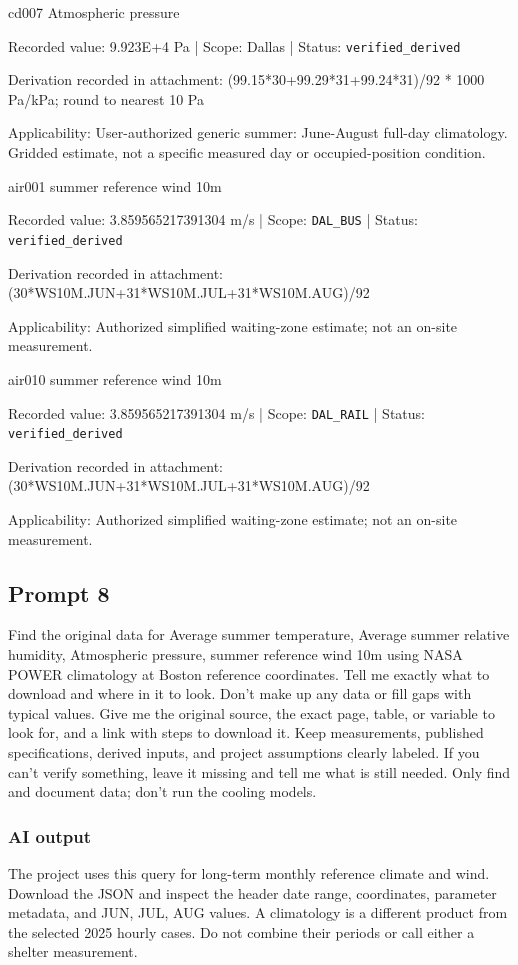 cd007  Atmospheric pressure

Recorded value: 9.923E+4 Pa | Scope: Dallas | Status: \nolinkurl{verified_derived}

Derivation recorded in attachment: (99.15*30+99.29*31+99.24*31)/92 * 1000 Pa/kPa; round to nearest 10 Pa

Applicability: User-authorized generic summer: June-August full-day climatology. Gridded estimate, not a specific measured day or occupied-position condition.

air001  summer reference wind 10m

Recorded value: 3.859565217391304 m/s | Scope: \nolinkurl{DAL_BUS} | Status: \nolinkurl{verified_derived}

Derivation recorded in attachment: (30*WS10M.JUN+31*WS10M.JUL+31*WS10M.AUG)/92

Applicability: Authorized simplified waiting-zone estimate; not an on-site measurement.

air010  summer reference wind 10m

Recorded value: 3.859565217391304 m/s | Scope: \nolinkurl{DAL_RAIL} | Status: \nolinkurl{verified_derived}

Derivation recorded in attachment: (30*WS10M.JUN+31*WS10M.JUL+31*WS10M.AUG)/92

Applicability: Authorized simplified waiting-zone estimate; not an on-site measurement.

\subsection*{Prompt 8}
Find the original data for Average summer temperature, Average summer relative humidity, Atmospheric pressure, summer reference wind 10m using NASA POWER climatology at Boston reference coordinates. Tell me exactly what to download and where in it to look. Don’t make up any data or fill gaps with typical values. Give me the original source, the exact page, table, or variable to look for, and a link with steps to download it. Keep measurements, published specifications, derived inputs, and project assumptions clearly labeled. If you can’t verify something, leave it missing and tell me what is still needed. Only find and document data; don’t run the cooling models.

\subsubsection*{AI output}
The project uses this query for long-term monthly reference climate and wind. Download the JSON and inspect the header date range, coordinates, parameter metadata, and JUN, JUL, AUG values. A climatology is a different product from the selected 2025 hourly cases. Do not combine their periods or call either a shelter measurement.

